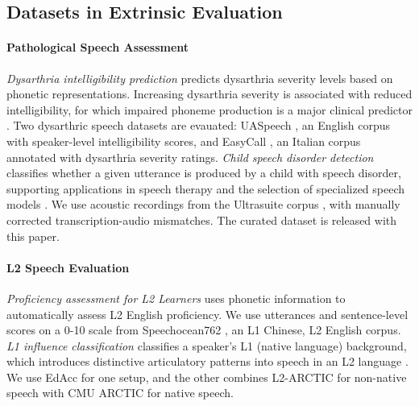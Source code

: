 \subsection{Datasets in Extrinsic Evaluation}
\label{appendix:datadetails-downstream}

\paragraph{Pathological Speech Assessment}
\textit{Dysarthria intelligibility prediction} predicts dysarthria severity levels based on phonetic representations. Increasing dysarthria severity is associated with reduced intelligibility, for which impaired phoneme production is a major clinical predictor \cite{xue2023assessing}. Two dysarthric speech datasets are evauated: UASpeech \cite{kim08c_interspeech}, an English corpus with speaker-level intelligibility scores, and EasyCall \cite{turrisi21_interspeech}, an Italian corpus annotated with dysarthria severity ratings. 
\textit{Child speech disorder detection} classifies whether a given utterance is produced by a child with speech disorder, supporting applications in speech therapy and the selection of specialized speech models \cite{rosero2025b, rosero2025a}.
We use acoustic recordings from the Ultrasuite corpus \cite{eshky2018ultrasuite}, with manually corrected transcription-audio mismatches. The curated dataset is released with this paper. %

\paragraph{L2 Speech Evaluation}
\textit{Proficiency assessment for L2 Learners} uses phonetic information to automatically assess L2 English proficiency. We use utterances and sentence-level scores on a 0-10 scale from Speechocean762 \cite{zhang2021speechocean762opensourcenonnativeenglish}, an L1 Chinese, L2 English corpus. 
\textit{L1 influence classification} classifies a speaker’s L1 (native language) background, which introduces distinctive articulatory patterns into speech in an L2 language \cite{yang23_interspeech, shi21_icassp}.
We use EdAcc \cite{sanabria2023edacc} for one setup, and the other combines L2-ARCTIC \cite{zhao18_interspeech} for non-native speech with CMU ARCTIC \cite{kominek04_ssw} for native speech. %

